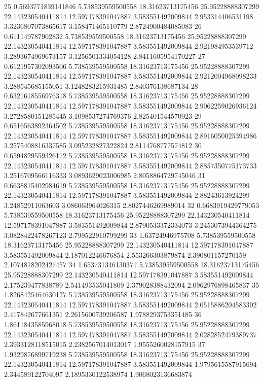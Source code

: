 {25 0.5693771839141846 5.738539559500558 18.31623713175456 25.95228888307299 22.143230540411814 12.597178391047887 3.583551492009844 2.953314406531198 3.3236807073865617 3.158471465110779 2.8724900484085083
26 0.611149787902832 5.738539559500558 18.31623713175456 25.95228888307299 22.143230540411814 12.597178391047887 3.583551492009844 2.921984953539712 3.2893674969673157 3.1256501334054128 2.8411605954170227
27 0.6121957302093506 5.738539559500558 18.31623713175456 25.95228888307299 22.143230540411814 12.597178391047887 3.583551492009844 2.9212004968098233 3.288545685155051 3.1248283215931485 2.840376138687134
28 0.6321618556976318 5.738539559500558 18.31623713175456 25.95228888307299 22.143230540411814 12.597178391047887 3.583551492009844 2.9062259026936124 3.2728580151285445 3.1098537274769376 2.825401544570923
29 0.6516563892364502 5.738539559500558 18.31623713175456 25.95228888307299 22.143230540411814 12.597178391047887 3.583551492009844 2.8916050025394986 3.2575408816337585 3.095232827322824 2.8114768777574812
30 0.6594829559326172 5.738539559500558 18.31623713175456 25.95228888307299 22.143230540411814 12.597178391047887 3.583551492009844 2.8857350775173733 3.2516709566116333 3.0893629023006985 2.8058864729745046
31 0.6638815402984619 5.738539559500558 18.31623713175456 25.95228888307299 22.143230540411814 12.597178391047887 3.583551492009844 2.88243613924299 3.24852911063603 3.086063964026315 2.8027446269989014
32 0.6683919429779053 5.738539559500558 18.31623713175456 25.95228888307299 22.143230540411814 12.597178391047887 3.583551492009844 2.8790533372334073 3.2453073944364275 3.0828422478267123 2.799522910799299
33 1.63724946975708 5.738539559500558 18.31623713175456 25.95228888307299 22.143230540411814 12.597178391047887 3.583551492009844 2.187012246676854 2.553266303879874 2.390801157270159 2.1074818202427457
34 1.653731346130371 5.738539559500558 18.31623713175456 25.95228888307299 22.143230540411814 12.597178391047887 3.583551492009844 2.175239477838789 2.541493535041809 2.379028388432094 2.0962976898465837
35 1.8268425464630127 5.738539559500558 18.31623713175456 25.95228888307299 22.143230540411814 12.597178391047887 3.583551492009844 2.0515886204583302 2.417842677661351 2.2615600739206587 1.9788293753351485
36 1.8611843585968018 5.738539559500558 18.31623713175456 25.95228888307299 22.143230540411814 12.597178391047887 3.583551492009844 2.0282852479389737 2.3933128118515015 2.2382567014013017 1.9555260028157915
37 1.9329876899719238 5.738539559500558 18.31623713175456 25.95228888307299 22.143230540411814 12.597178391047887 3.583551492009844 1.9795615587915694 2.344589122704097 2.1895330122538974 1.9068023136683874
}
